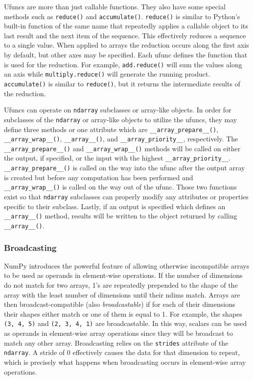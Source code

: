 \documentclass{sigplanconf}
\begin{document}
Ufuncs are more than just callable functions. They also have some special
methods such as \verb=reduce()= and \verb=accumulate()=. \verb=reduce()= is
similar to Python’s built-in function of the same name that repeatedly applies
a callable object to its last result and the next item of the sequence. This
effectively reduces a sequence to a single value. When applied to arrays the
reduction occurs along the first axis by default, but other axes may be
specified. Each ufunc defines the function that is used for the reduction. For
example, \verb=add.reduce()= will sum the values along an axis while
\verb=multiply.reduce()= will generate the running product.
\verb=accumulate()= is similar to \verb=reduce()=, but it returns the
intermediate results of the reduction.

Ufuncs can operate on \verb=ndarray= subclasses or array-like objects. In
order for subclasses of the \verb=ndarray= or array-like objects to utilize
the ufuncs, they may define three methods or one attribute which are
\verb=__array_prepare__()=, \verb=__array_wrap__()=, \verb=__array__()=, and
\verb=__array_priority__=, respectively.  The\linebreak
\verb=__array_prepare__()= and \verb=__array_wrap__()= methods will be called
on either the output, if specified, or the input with the highest
\verb=__array_priority__=.  \verb=__array_prepare__()= is called on the way
into the ufunc after the output array is created but before any computation
has been performed and \verb=__array_wrap__()= is called on the way out of the
ufunc. Those two functions exist so that \verb=ndarray= subclasses can
properly modify any attributes or properties specific to their subclass.
Lastly, if an output is specified which defines an \verb=__array__()= method,
results will be written to the object returned by calling \verb=__array__()=.

\subsubsection{Broadcasting}

NumPy introduces the powerful feature of allowing otherwise incompatible
arrays to be used as operands in element-wise operations. If the number of
dimensions do not match for two arrays, 1’s are repeatedly prepended to the
shape of the array with the least number of dimensions until their ndims
match. Arrays are then broadcast-compatible (also \emph{broadcastable}) if for
each of their dimensions their shapes either match or one of them is equal to
1.  For example, the shapes \verb=(3, 4, 5)= and \verb=(2, 3, 4, 1)= are
broadcastable. In this way, scalars can be used as operands in element-wise
array operations since they will be broadcast to match any other array.
Broadcasting relies on the \texttt{strides} attribute of the \texttt{ndarray}.
A stride of 0 effectively causes the data for that dimension to repeat, which
is precisely what happens when broadcasting occurs in element-wise array
operations.
\end{document}
